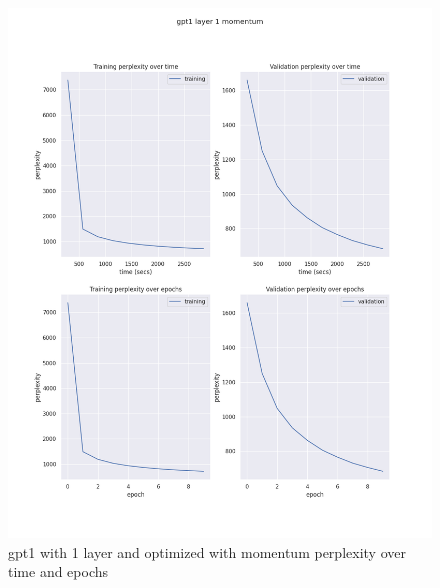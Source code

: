 \documentclass[12pt]{article}
\theoremstyle{definition}
\begin{document}
\begin{figure}[H]
     \centering
     \includegraphics[scale=0.4]{gpt1_layer_1_momentum.png}
     \caption{gpt1 with 1 layer and optimized with momentum perplexity over time and epochs}
\end{figure}
\end{document}
